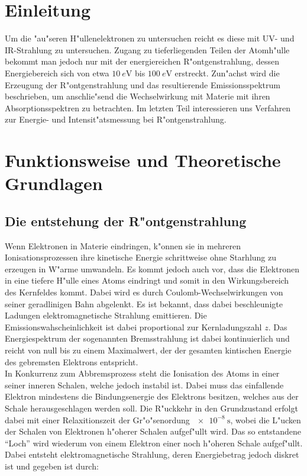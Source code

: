 \section{Einleitung}
\label{sec:einleitung}
	Um die "au"seren H"ullenelektronen zu untersuchen reicht es diese mit UV- und IR-Strahlung zu untersuchen. Zugang zu tieferliegenden Teilen der Atomh"ulle bekommt man jedoch nur mit der energiereichen R"ontgenstrahlung, dessen Energiebereich sich von etwa $\SI{10}{e\volt}$ bis $\SI{100}{e\volt}$ erstreckt.
	\vspace{0.3cm}
	Zun"achst wird die Erzeugung der R"ontgenstrahlung und das resultierende Emissionsspektrum beschrieben, um anschlie"send die Wechselwirkung mit Materie mit ihren Absorptionsspektren zu betrachten. Im letzten Teil interessieren uns Verfahren zur Energie- und Intensit"atsmessung bei R"ontgenstrahlung.

\section{Funktionsweise und Theoretische Grundlagen}
\label{sec:funktionsweise}

	
	\subsection{Die entstehung der R"ontgenstrahlung}
	\label{sub:entstehung}

		Wenn Elektronen in Materie eindringen, k"onnen sie in mehreren Ionisationsprozessen ihre kinetische Energie schrittweise ohne Starhlung zu erzeugen in W"arme umwandeln.
		Es kommt jedoch auch vor, dass die Elektronen in eine tiefere H"ulle eines Atoms eindringt und somit in den Wirkungsbereich des Kernfeldes kommt.
		Dabei wird es durch Coulomb-Wechselwirkungen von seiner geradlinigen Bahn abgelenkt.
		Es ist bekannt, dass dabei beschleunigte Ladungen elektromagnetische Strahlung emittieren.
		Die E\-mis\-sions\-wah\-schein\-lich\-keit ist dabei proportional zur Kernladungszahl $z$.
		Das Energiespektrum der sogenannten Bremsstrahlung ist dabei kontinuierlich und reicht von null bis zu einem Maximalwert, der der gesamten kintischen Energie des gebremsten Elektrons entspricht.
		\\
		In Konkurrenz zum Abbremsprozess steht die Ionisation des Atoms in einer seiner inneren Schalen, welche jedoch instabil ist.
		Dabei muss das einfallende Elektron min\-des\-tens die Bindungsenergie des Elektrons besitzen, welches aus der Schale herausgeschlagen werden soll.
		Die R"uckkehr in den Grundzustand erfolgt dabei mit einer Relaxitionszeit der Gr"o"senordung $\SI{e-8}{\second}$, wobei die L"ucken der Schalen von Elektronen h"oherer Schalen aufgef"ullt wird. 
		Das so entstandene "`Loch"' wird wiederum von einem Elektron einer noch h"oheren Schale aufgef"ullt.
		Dabei entsteht elektromagnetische Strahlung, deren Energiebetrag jedoch diskret ist und gegeben ist durch:

